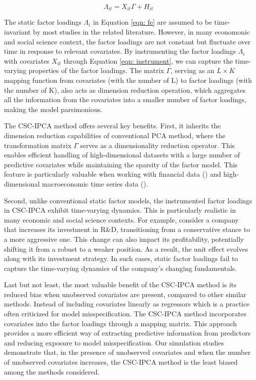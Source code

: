\documentclass[12pt]{article}
\begin{document}
\begin{equation}
\label{eqn: instrument}
\Lambda_{it} = X_{it}\Gamma + H_{it}
\end{equation}

The static factor loadings $\Lambda_i$ in Equation \ref{eqn: fe} are assumed to be time-invariant by most studies in the related literature. However, in many economonic and social science context, the factor loadings are not constant but fluctuate over time in response to relevant covariates. By instrumenting the factor loadings $\Lambda_i$ with covariates $X_{it}$ through Equation \ref{eqn: instrument}, we can capture the time-varying properties of the factor loadings. The matrix $\Gamma$, serving as an $L \times K$ mapping function from covariates (with the number of L) to factor loadings (with the number of K), also acts as dimension reduction operation, which aggregates all the information from the covariates into a smaller number of factor loadings, making the model parsimonious.

The CSC-IPCA method offers several key benefits. First, it inherits the dimension reduction capabilities of conventional PCA method, where the transformation matrix $\Gamma$ serves as a dimensionality reduction operator. This enables efficient handling of high-dimensional datasets with a large number of predictive covariates while maintaining the sparsity of the factor model. This feature is particularly valuable when working with financial data (\cite{feng2020taming}) and high-dimensional macroeconomic time series data (\cite{brave2009chicago}).

Second, unlike conventional static factor models, the instrumented factor loadings in CSC-IPCA exhibit time-varying dynamics. This is particularly realistic in many economic and social science contexts. For example, consider a company that increases its investment in R\&D, transitioning from a conservative stance to a more aggressive one. This change can also impact its profitability, potentially shifting it from a robust to a weaker position. As a result, the unit effect evolves along with its investment strategy. In such cases, static factor loadings fail to capture the time-varying dynamics of the company's changing fundamentals.

Last but not least, the most valuable benefit of the CSC-IPCA method is its reduced bias when unobserved covariates are present, compared to other similar methods. Instead of including covariates linearly as regressors which is a practice often criticized for model misspecification. The CSC-IPCA method incorporates covariates into the factor loadings through a mapping matrix. This approach provides a more efficient way of extracting predictive information from predictors and reducing exposure to model misspecification. Our simulation studies demonstrate that, in the presence of unobserved covariates and when the number of unobserved covariates increases, the CSC-IPCA method is the least biased among the methods considered.
\end{document}
